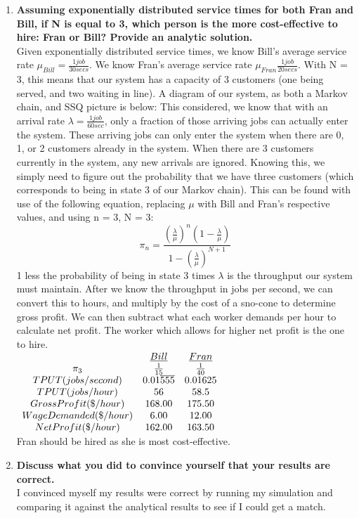 \documentclass[11pt]{article}
\begin{document}
\begin{enumerate}
	\item\textbf{Assuming exponentially distributed service times for both Fran and Bill, if N is equal to 3, which person is the more cost-effective to hire: Fran or Bill? Provide an analytic solution.}
	\\Given exponentially distributed service times, we know Bill's average service rate  $\mu_{Bill} = \frac{1 job}{30 secs}$. We know Fran's average service rate  $\mu_{Fran}\frac{1 job}{20 secs}$. With N = 3, this means that our system has a capacity of 3 customers (one being served, and two waiting in line).  A diagram of our system, as both a Markov chain, and SSQ picture is below:
	\vskip 6cm
	This considered, we know that with an arrival rate $\lambda = \frac{1job}{60sec}$, only a fraction of those arriving jobs can actually enter the system. These arriving jobs can only enter the system when there are 0, 1, or 2 customers already in the system. When there are 3 customers currently in the system, any new arrivals are ignored.  Knowing this, we simply need to figure out the probability that we have three customers (which corresponds to being in state 3 of our Markov chain). This can be found with use of the following equation, replacing $\mu$ with Bill and Fran's respective values, and using n = 3, N = 3:
	$$\pi_n = \frac{(\frac{\lambda}{\mu})^{n}(1-\frac{\lambda}{\mu})}{1-(\frac{\lambda}{\mu})^{N+1}}$$
	 1 less the probability of being in state 3 times $\lambda$ is the throughput our system must maintain. After we know the throughput in jobs per second, we can convert this to hours, and multiply by the cost of a sno-cone to determine gross profit. We can then subtract what each worker demands per hour to calculate net profit. The worker which allows for higher net profit is the one to hire.\\ 
			$\begin{array}{c c c}
			\underline{}&\underline{Bill}&\underline{Fran}\cr
			\pi_3&\frac{1}{15}&\frac{1}{40}\cr
			TPUT(jobs/second)& 0.01\overline{555}& 0.01625\cr
			TPUT(jobs/hour)& 56& 58.5\cr
			Gross Profit(\$/hour)& 168.00& 175.50\cr
			Wage Demanded(\$/hour)& 6.00& 12.00\cr
			Net Profit(\$/hour)& 162.00&163.50
			\end{array}$
	\\Fran should be hired as she is most cost-effective.
	\item\textbf{Discuss what you did to convince yourself that your results are correct.}
	\\I convinced myself my results were correct by running my simulation and comparing it against the analytical results to see if I could get a match.
\end{enumerate}
\end{document}
